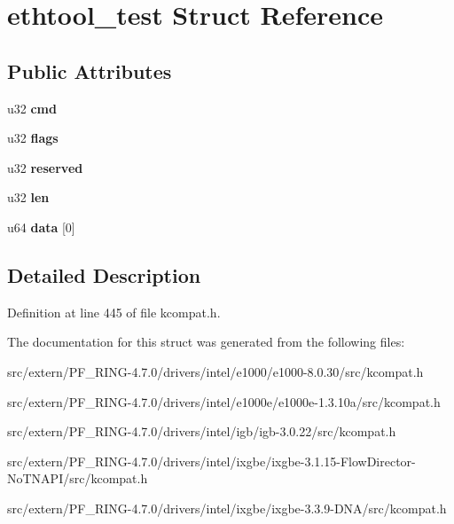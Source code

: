 \hypertarget{structethtool__test}{
\section{ethtool\_\-test Struct Reference}
\label{structethtool__test}
}
\subsection*{Public Attributes}
\begin{DoxyCompactItemize}
\item 
\hypertarget{structethtool__test_a5ba25918b7e6a2e0cd5780abb634d80e}{
u32 {\bfseries cmd}}
\label{structethtool__test_a5ba25918b7e6a2e0cd5780abb634d80e}

\item 
\hypertarget{structethtool__test_ab85899d1860fe41a0b5323787b7f8377}{
u32 {\bfseries flags}}
\label{structethtool__test_ab85899d1860fe41a0b5323787b7f8377}

\item 
\hypertarget{structethtool__test_adf5bc9c2cae8ed841d6df395949aed97}{
u32 {\bfseries reserved}}
\label{structethtool__test_adf5bc9c2cae8ed841d6df395949aed97}

\item 
\hypertarget{structethtool__test_aecbfe94a826a4fe841a3fb51996b8b6e}{
u32 {\bfseries len}}
\label{structethtool__test_aecbfe94a826a4fe841a3fb51996b8b6e}

\item 
\hypertarget{structethtool__test_acaf5bef271885348c30292d154932443}{
u64 {\bfseries data} \mbox{[}0\mbox{]}}
\label{structethtool__test_acaf5bef271885348c30292d154932443}

\end{DoxyCompactItemize}


\subsection{Detailed Description}


Definition at line 445 of file kcompat.h.



The documentation for this struct was generated from the following files:\begin{DoxyCompactItemize}
\item 
src/extern/PF\_\-RING-\/4.7.0/drivers/intel/e1000/e1000-\/8.0.30/src/kcompat.h\item 
src/extern/PF\_\-RING-\/4.7.0/drivers/intel/e1000e/e1000e-\/1.3.10a/src/kcompat.h\item 
src/extern/PF\_\-RING-\/4.7.0/drivers/intel/igb/igb-\/3.0.22/src/kcompat.h\item 
src/extern/PF\_\-RING-\/4.7.0/drivers/intel/ixgbe/ixgbe-\/3.1.15-\/FlowDirector-\/NoTNAPI/src/kcompat.h\item 
src/extern/PF\_\-RING-\/4.7.0/drivers/intel/ixgbe/ixgbe-\/3.3.9-\/DNA/src/kcompat.h\end{DoxyCompactItemize}
